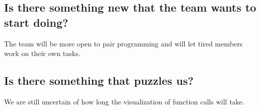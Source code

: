\subsection*{Is there something new that the team wants to start doing?}
The team will be more open to pair programming and will let tired members work on their own tasks. 

\subsection*{ Is there something that puzzles us?}
We are still uncertain of how long the visualization of function calls will take. 

\newpage
